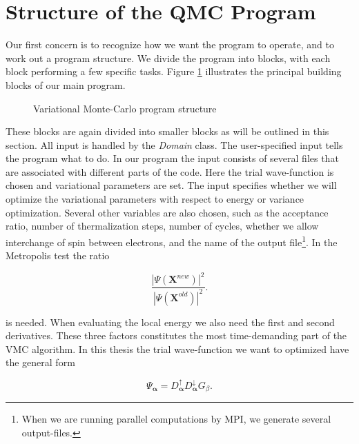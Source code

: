\section{Structure of the QMC Program}
\label{StructureOfTheQMCProgram}

Our first concern is to recognize how we want the program to operate, and
to work out a program structure. We divide the program into blocks,
with each block performing a few specific tasks. Figure
\ref{program_structure} illustrates the principal building blocks of
our main program.

\begin{figure}[hbtp]
\begin{center}
  
  \caption{Variational Monte-Carlo program structure}
  \label{program_structure}
\end{center}
\end{figure}

These blocks are again divided into smaller blocks as will be
outlined in this section. All input is handled by the \emph{Domain}
class. The user-specified input tells the program what to do. In our
program the input consists of several files that are associated with
different parts of the code. Here the trial wave-function is chosen
and variational parameters are set. The input specifies whether
we will optimize the variational parameters with respect to energy or
variance optimization. Several other variables are also chosen, such
as the acceptance ratio, number of thermalization steps, number of
cycles, whether we allow interchange of spin between
electrons, and the name of the output file\footnote{When we are
  running parallel computations by MPI, we generate several
  output-files.}.
\newline
%
\newline
In the Metropolis test the ratio

\begin{equation*}
  \frac{|\Psi(\mathbf{X}^{new})|^2}{|\Psi(\mathbf{X}^{old})|^2}.
\end{equation*}

is needed. When evaluating the local energy we also need the first and
second derivatives. These three factors constitutes the most
time-demanding part of the VMC algorithm. In this thesis the trial
wave-function we want to optimized have the general form

\begin{equation}
  \Psi_{\mathbf{\alpha}} = D_{\mathbf{\alpha}}^{\uparrow}
  D_{\mathbf{\alpha}}^{\downarrow} G_{\beta}.
\label{trialWaveFunctionForm}
\end{equation}


